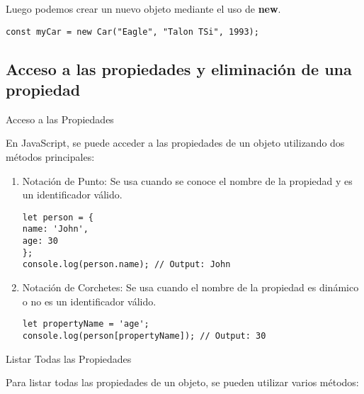 \documentclass{article}
\begin{document}
Luego podemos crear un nuevo objeto mediante el uso de \textbf{new}.

\begin{lstlisting}
const myCar = new Car("Eagle", "Talon TSi", 1993);
\end{lstlisting}

\subsection{Acceso a las propiedades y eliminación de una propiedad}

Acceso a las Propiedades

En JavaScript, se puede acceder a las propiedades de un objeto utilizando dos métodos principales:

\begin{enumerate}
      \item Notación de Punto: Se usa cuando se conoce el nombre de la propiedad y es un identificador válido.
\begin{lstlisting}
let person = {
name: 'John',
age: 30
};
console.log(person.name); // Output: John      
\end{lstlisting}

      \item Notación de Corchetes: Se usa cuando el nombre de la propiedad es dinámico o no es un identificador válido.
\begin{lstlisting}
let propertyName = 'age';
console.log(person[propertyName]); // Output: 30            
\end{lstlisting}

\end{enumerate}

Listar Todas las Propiedades

Para listar todas las propiedades de un objeto, se pueden utilizar varios métodos:
\end{document}
